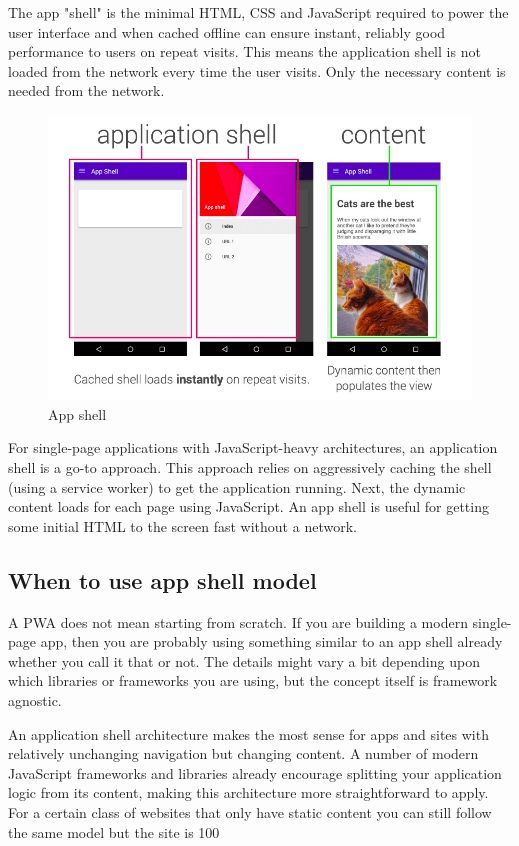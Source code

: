 \documentclass[14pt,a4paper,final]{extreport}
\begin{document}
The app "shell" is the minimal HTML, CSS and JavaScript required to power the user interface and when cached offline can ensure instant, reliably good performance to users on repeat visits. This means the application shell is not loaded from the network every time the user visits. Only the necessary content is needed from the network.
\begin{figure}[h!]
		\includegraphics[scale=.56]{apshell.jpeg}
    \caption{App shell}
\end{figure}
\newline
\newline
For single-page applications with JavaScript-heavy architectures, an application shell is a go-to approach. This approach relies on aggressively caching the shell (using a service worker) to get the application running. Next, the dynamic content loads for each page using JavaScript. An app shell is useful for getting some initial HTML to the screen fast without a network.

\subsection{When to use app shell model}
\itemBuilding A PWA does not mean starting from scratch. If you are building a modern single-page app, then you are probably using something similar to an app shell already whether you call it that or not. The details might vary a bit depending upon which libraries or frameworks you are using, but the concept itself is framework agnostic.

An application shell architecture makes the most sense for apps and sites with relatively unchanging navigation but changing content. A number of modern JavaScript frameworks and libraries already encourage splitting your application logic from its content, making this architecture more straightforward to apply. For a certain class of websites that only have static content you can still follow the same model but the site is 100%
\end{document}

